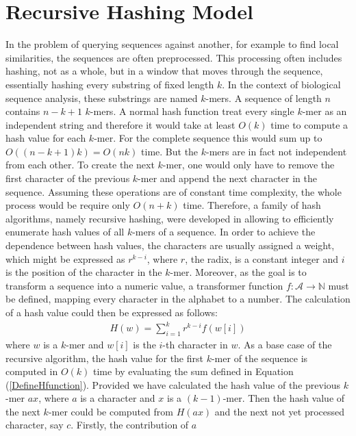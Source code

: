 \documentclass[11pt,a4paper]{scrartcl}
\begin{document}
\section{Recursive Hashing Model~\cite{cohen1997recursive}}
In the problem of querying sequences against another, for example to find
local similarities, the sequences are often preprocessed. This processing
often includes hashing, not as a whole, but in a window that moves through
the sequence, essentially hashing every substring of fixed length $k$.
In the context of biological sequence analysis, these substrings are
named $k$-mers. A sequence of length $n$ contains $n-k+1$ $k$-mers.
A normal hash function treat every single $k$-mer as an
independent string and therefore it would take at least \(O(k)\) time to
compute a hash value for each \(k\)-mer. For the complete sequence this
would sum up to $O((n-k+1)k)=O(nk)$ time.
But the $k$-mers are in fact not
independent from each other. To create the next \(k\)-mer,
one would only have to remove the first
character of the previous \(k\)-mer and append the next character in the
sequence. Assuming these operations are of constant
time complexity, the whole process would be require only $O(n+k)$ time.
Therefore,
a family of hash algorithms, namely recursive hashing, were developed in
allowing to efficiently enumerate hash values of all \(k\)-mers of a
sequence.
In order to achieve the
dependence between hash values, the characters are usually assigned a
weight, which might be expressed as $r^{k-i}$, where $r$, the radix, is a
constant integer and $i$ is the position of the character in the $k$-mer.
Moreover, as the goal is to transform a sequence into a numeric
value, a transformer function $f:\mathcal{A}\to \mathbb{N}$ must be
defined,
mapping every character in the alphabet to a number. The
calculation of a hash value could then be expressed as follows:
\begin{align}
H(w) = \sum_{i=1}^kr^{k-i}f(w[i])\label{DefineHfunction}
\end{align}
where $w$ is a \(k\)-mer and $w[i]$ is the $i$-th character in $w$.
As a base case of the recursive algorithm, the hash value for the
first $k$-mer of the sequence is computed in \(O(k)\) time by evaluating
the
sum defined in Equation (\ref{DefineHfunction}).
Provided we have calculated the hash value of the previous $k$-mer
\(ax\), where \(a\) is a character and \(x\) is a \((k-1)\)-mer.
Then the hash value
of the next \(k\)-mer could be computed from \(H(ax)\) and the next not yet
processed character, say \(c\). Firstly, the contribution of \(a\)
\end{document}
